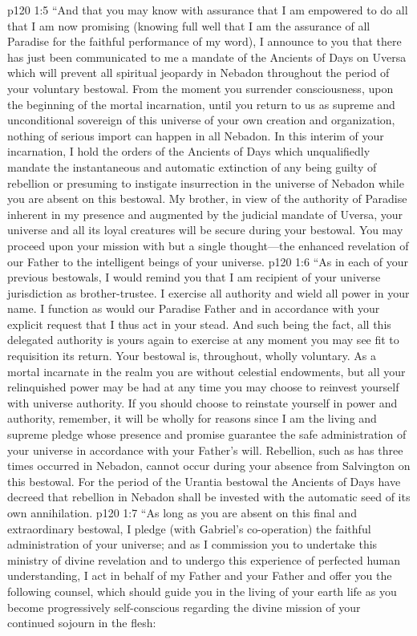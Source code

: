 \vs p120 1:5 “And that you may know with assurance that I am empowered to do all that I am now promising (knowing full well that I am the assurance of all Paradise for the faithful performance of my word), I announce to you that there has just been communicated to me a mandate of the Ancients of Days on Uversa which will prevent all spiritual jeopardy in Nebadon throughout the period of your voluntary bestowal. From the moment you surrender consciousness, upon the beginning of the mortal incarnation, until you return to us as supreme and unconditional sovereign of this universe of your own creation and organization, nothing of serious import can happen in all Nebadon. In this interim of your incarnation, I hold the orders of the Ancients of Days which unqualifiedly mandate the instantaneous and automatic extinction of any being guilty of rebellion or presuming to instigate insurrection in the universe of Nebadon while you are absent on this bestowal. My brother, in view of the authority of Paradise inherent in my presence and augmented by the judicial mandate of Uversa, your universe and all its loyal creatures will be secure during your bestowal. You may proceed upon your mission with but a single thought---the enhanced revelation of our Father to the intelligent beings of your universe.\plusone
\vs p120 1:6 “As in each of your previous bestowals, I would remind you that I am recipient of your universe jurisdiction as brother\hyp{}trustee. I exercise all authority and wield all power in your name. I function as would our Paradise Father and in accordance with your explicit request that I thus act in your stead. And such being the fact, all this delegated authority is yours again to exercise at any moment you may see fit to requisition its return. Your bestowal is, throughout, wholly voluntary. As a mortal incarnate in the realm you are without celestial endowments, but all your relinquished power may be had at any time you may choose to reinvest yourself with universe authority. If you should choose to reinstate yourself in power and authority, remember, it will be wholly for  reasons since I am the living and supreme pledge whose presence and promise guarantee the safe administration of your universe in accordance with your Father’s will. Rebellion, such as has three times occurred in Nebadon, cannot occur during your absence from Salvington on this bestowal. For the period of the Urantia bestowal the Ancients of Days have decreed that rebellion in Nebadon shall be invested with the automatic seed of its own annihilation.
\vs p120 1:7 “As long as you are absent on this final and extraordinary bestowal, I pledge (with Gabriel’s co\hyp{}operation) the faithful administration of your universe; and as I commission you to undertake this ministry of divine revelation and to undergo this experience of perfected human understanding, I act in behalf of my Father and your Father and offer you the following counsel, which should guide you in the living of your earth life as you become progressively self\hyp{}conscious regarding the divine mission of your continued sojourn in the flesh:
